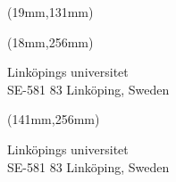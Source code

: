 \documentclass[a4paper]{memoir}
\begin{document}
\begin{textblock*}{173mm}(19mm,131mm)
  \setlength{\fboxrule}{1mm}
  \thicklines
\end{textblock*}

\fontsize{12}{14pt}\selectfont
\begin{textblock*}{52mm}(18mm,256mm)
  \begin{centering}
    Linköpings universitet\\
    SE-581 83 Linköping, Sweden
  \end{centering}
\end{textblock*}


\fontsize{12}{14pt}\selectfont
\begin{textblock*}{52mm}(141mm,256mm)
  \begin{centering}
    Linköpings universitet\\
    SE-581 83 Linköping, Sweden
  \end{centering}
\end{textblock*}
\end{document}
